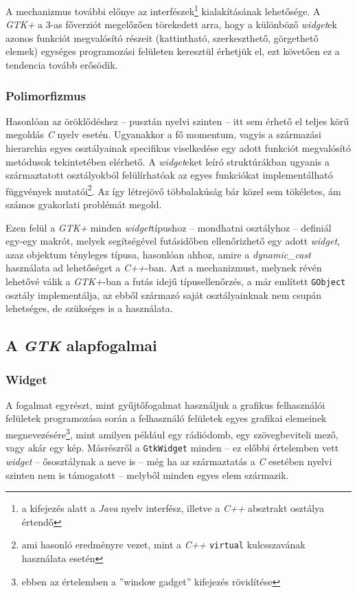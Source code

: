 A mechanizmus további előnye az interfészek\footnote{a kifejezés alatt a \textit{Java} nyelv interfész, illetve a \textit{C++} absztrakt osztálya értendő} kialakításának lehetősége. A \textit{GTK+} a 3-as főverziót megelőzően törekedett arra, hogy a különböző \textit{widget}ek azonos funkciót megvalósító részeit (kattintható, szerkeszthető, görgethető elemek) egységes programozási felületen keresztül érhetjük el, ezt követően ez a tendencia tovább erősödik.

\subsubsection{Polimorfizmus}

Hasonlóan az öröklődéshez -- pusztán nyelvi szinten -- itt sem érhető el teljes körű megoldás \textit{C} nyelv esetén. Ugyanakkor a fő momentum, vagyis a származási hierarchia egyes osztályainak specifikus viselkedése egy adott funkciót megvalósító metódusok tekintetében elérhető. A \textit{widget}eket leíró struktúrákban ugyanis a származtatott osztályokból felülírhatóak az egyes funkciókat implementálható függvények mutatói\footnote{ami hasonló eredményre vezet, mint a \textit{C++} \texttt{virtual} kulcsszavának használata esetén}. Az így létrejövő többalakúság bár közel sem tökéletes, ám számos gyakorlati problémát megold.

Ezen felül a \textit{GTK+} minden \textit{widget}típushoz -- mondhatni osztályhoz -- definiál egy-egy makrót, melyek segítségével futásidőben ellenőrizhető egy adott \textit{widget}, azaz objektum tényleges típusa, hasonlóan ahhoz, amire a \textit{dynamic\_cast} használata ad lehetőséget a \textit{C++}-ban. Azt a mechanizmust, melynek révén lehetővé válik a \textit{GTK+}-ban a futás idejű típusellenőrzés, a már említett \texttt{GObject} osztály implementálja, az ebből származó saját osztályainknak nem csupán lehetséges, de szükséges is a használata.

\subsection{A \textit{GTK} alapfogalmai}

\subsubsection{Widget}

A fogalmat egyrészt, mint gyűjtőfogalmat használjuk a grafikus felhasználói felületek programozása során a felhasználó felületek egyes grafikai elemeinek megnevezésére\footnote{ebben az értelemben a ''window gadget'' kifejezés rövidítése}, mint amilyen például egy rádiódomb, egy szövegbeviteli mező, vagy akár egy kép.  Másrészről a \texttt{GtkWidget} minden -- ez előbbi értelemben vett \textit{widget} -- ősosztálynak a neve is -- még ha az származtatás a \textit{C} esetében nyelvi szinten nem is támogatott -- melyből minden egyes elem származik.

